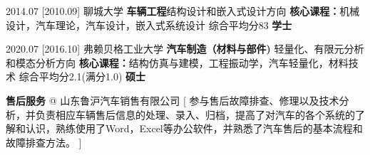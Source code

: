 \documentclass[zh]{resume}
\begin{document}
	\begin{educations}
		
		
		\education%
		{2014.07}%
		[2010.09]%
		{聊城大学}%
		{\textbf{车辆工程}\textbullet 结构设计和嵌入式设计方向 }%
		{\textbf{核心课程：}机械设计，汽车理论，汽车设计，嵌入式系统设计 \textbullet 综合平均分83}%
		{\textbf{学士}}
		
		\separator{0.5ex}
		
		\education%
		{2020.07}%
		[2016.10]%
		{弗赖贝格工业大学}%
		{\textbf{汽车制造（材料与部件)} \textbullet  轻量化、有限元分析和模态分析方向}%
		{\textbf{核心课程：}结构仿真与建模，工程振动学，汽车轻量化，材料技术 \textbullet 综合平均分2.1(满分1.0)}%
		{\textbf{硕士}}
		
			
	\end{educations}


	\begin{experiences}
		{\textbf{售后服务} @ 山东鲁沪汽车销售有限公司}%
		[ 参与售后故障排查、修理以及技术分析，并负责相应车辆售后信息的处理、录入、归档，提高了对汽车的各个系统的了解和认识，熟练使用了Word，Excel等办公软件，并熟悉了汽车售后的基本流程和故障排查方法。
		]
	\end{experiences}
\end{document}
